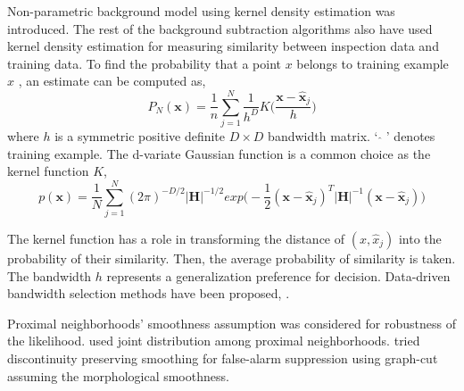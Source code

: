 \documentclass[conference]{IEEEtran}
\begin{document}
Non-parametric background model using kernel density estimation \cite{Elgammal} was introduced. The rest of the background subtraction algorithms also have used kernel density estimation for measuring similarity between inspection data and training data. To find the probability that a point \begin{math} x \end{math}  belongs to training example \begin{math} \hat{x} \end{math} , an estimate can be computed as,
\begin{equation}\label{eq:10}
  P_N( \mathbf{x} ) = \frac{1}{n} \sum_{j=1}^N \frac{1}{h^D}K \Big( \frac{ \mathbf{x} - \hat{\mathbf{x}}_j } {h} \Big)
\end{equation}
where \begin{math} h \end{math} is a symmetric positive definite \begin{math} D \times D \end{math} bandwidth matrix. ` \begin{math} \hat{} \end{math} ' denotes training example. The d-variate Gaussian function is a common choice as the kernel function \begin{math} K \end{math}, 
\begin{equation}\label{eq:20}
  p( \mathbf{x} ) = \frac{1}{N} \sum_{j=1}^N (2\pi)^{-D/2} |\mathbf{H}|^{-1/2}
                    exp \Big( -\frac{1}{2} (\mathbf{x} - \hat{\mathbf{x}}_j)^T |\mathbf{H}|^{-1}  (\mathbf{x} - \hat{\mathbf{x}}_j ) \Big) 
\end{equation}

The kernel function has a role in transforming the distance of \begin{math} (x , \hat{x}_j) \end{math}  into the probability of their similarity. Then, the average probability of similarity is taken. The bandwidth \begin{math} h \end{math} represents a generalization preference for decision. Data-driven bandwidth selection methods have been proposed, \cite{Jones, Comaniciu}.

Proximal neighborhoods' smoothness assumption was considered for robustness of the likelihood. \cite{Elgammal} used joint distribution among proximal neighborhoods. \cite{Sheikh} tried discontinuity preserving smoothing for false-alarm suppression using graph-cut assuming the morphological smoothness.
\end{document}
